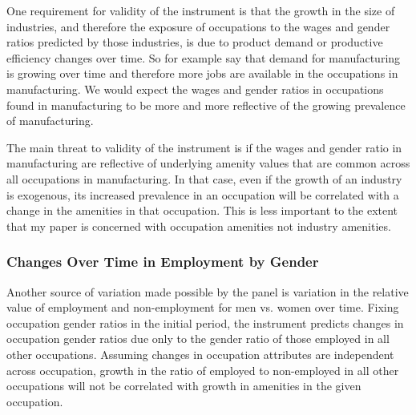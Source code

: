 \documentclass[11pt]{article}
\begin{document}
One requirement for validity of the instrument is that the growth in the size of industries, and therefore the exposure of occupations to the wages and gender ratios predicted by those industries, is due to product demand or productive efficiency changes over time. So for example say that demand for manufacturing is growing over time and therefore more jobs are available in the occupations in manufacturing. We would expect the wages and gender ratios in occupations found in manufacturing to be more and more reflective of the growing prevalence of manufacturing.

The main threat to validity of the instrument is if the wages and gender ratio in manufacturing are reflective of underlying amenity values that are common across all occupations in manufacturing. In that case, even if the growth of an industry is exogenous, its increased prevalence in an occupation will be correlated with a change in the amenities in that occupation. This is less important to the extent that my paper is concerned with occupation amenities not industry amenities.






\subsubsection{Changes Over Time in Employment by Gender}
Another source of variation made possible by the panel is variation in the relative value of employment and non-employment for men vs. women over time. Fixing occupation gender ratios in the initial period, the instrument predicts changes in occupation gender ratios due only to the gender ratio of those employed in all other occupations. Assuming changes in occupation attributes are independent across occupation, growth in the ratio of employed to non-employed in all other occupations will not be correlated with growth in amenities in the given occupation. 
\end{document}
